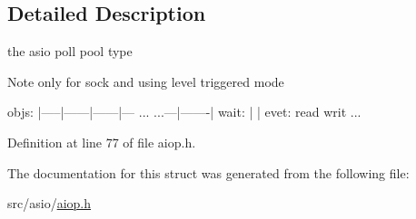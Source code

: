 \subsection{Detailed Description}
the asio poll pool type

\begin{DoxyNote}{Note}
only for sock and using level triggered mode
\end{DoxyNote}

\begin{DoxyPre}
objs: |-----|------|------|--- ... ...---|-------|
wait:    |            |
evet:   read         writ ...
\end{DoxyPre}
 

Definition at line 77 of file aiop.\-h.



The documentation for this struct was generated from the following file\-:\begin{DoxyCompactItemize}
\item 
src/asio/\hyperlink{aiop_8h}{aiop.\-h}\end{DoxyCompactItemize}
